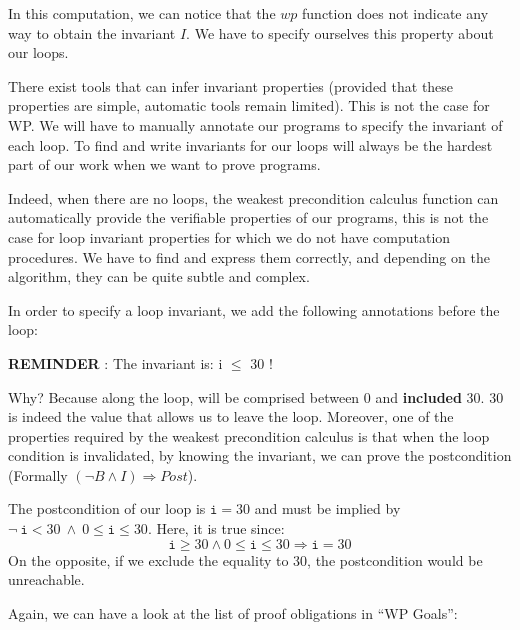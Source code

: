 In this computation, we can notice that the $wp$ function does not
indicate any way to obtain the invariant $I$. We have to specify
ourselves this property about our loops.





There exist tools that can infer invariant properties (provided that
these properties are simple, automatic tools remain limited). This is not
the case for WP. We will have to manually annotate our programs to
specify the invariant of each loop. To find and write invariants for our
loops will always be the hardest part of our work when we want to prove
programs.



Indeed, when there are no loops, the weakest precondition calculus
function can automatically provide the verifiable properties of our
programs, this is not the case for loop invariant properties for which we
do not have computation procedures. We have to find and express them
correctly, and depending on the algorithm, they can be quite subtle and
complex.



In order to specify a loop invariant, we add the following annotations
before the loop:






\begin{Warning}
  \textbf{REMINDER} : The invariant is: i \textbf{$\leq$} 30 !
\end{Warning}


Why? Because along the loop,  will be comprised between 0 and
\textbf{included} 30. 30 is indeed the value that allows us to leave the
loop. Moreover, one of the properties required by the weakest
precondition calculus is that when the loop condition is invalidated, by
knowing the invariant, we can prove the postcondition (Formally
$(\neg B \wedge I) \Rightarrow Post$).

The postcondition of our loop is $\texttt{i} = 30$ and must be implied
by $\neg\ \texttt{i} < 30\ \wedge\ 0 \leq \texttt{i} \leq 30$. Here, it is
true since:
$$\texttt{i} \geq 30 \wedge 0 \leq \texttt{i} \leq 30 \Rightarrow \texttt{i} = 30$$
On the opposite, if we exclude the equality to 30, the postcondition
would be unreachable.



Again, we can have a look at the list of proof obligations in ``WP Goals'':




